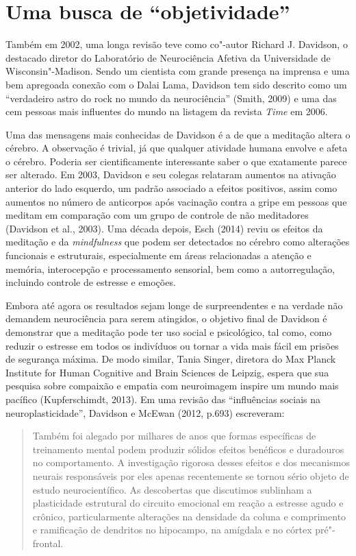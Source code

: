 \chapter{Uma busca de ``objetividade''}

Também em 2002, uma longa revisão teve como co"-autor Richard J.
Davidson, o destacado diretor do Laboratório de Neurociência Afetiva da
Universidade de Wisconsin"-Madison. Sendo um cientista com grande
presença na imprensa e uma bem apregoada conexão com o Dalai Lama,
Davidson tem sido descrito como um ``verdadeiro astro do rock no mundo
da neurociência'' (Smith, 2009) e uma das cem pessoas mais influentes do
mundo na listagem da revista \emph{Time} em 2006.

Uma das mensagens mais conhecidas de Davidson é a de que a meditação
altera o cérebro. A observação é trivial, já que qualquer atividade
humana envolve e afeta o cérebro. Poderia ser cientificamente
interessante saber o que exatamente parece ser alterado. Em 2003,
Davidson e seu colegas relataram aumentos na ativação anterior do lado
esquerdo, um padrão associado a efeitos positivos, assim como aumentos
no número de anticorpos após vacinação contra a gripe em pessoas que
meditam em comparação com um grupo de controle de não meditadores
(Davidson et al., 2003). Uma década depois, Esch (2014) reviu os efeitos
da meditação e da \emph{mindfulness} que podem ser detectados no cérebro
como alterações funcionais e estruturais, especialmente em áreas
relacionadas a atenção e memória, interocepção e processamento
sensorial, bem como a autorregulação, incluindo controle de estresse e
emoções.

Embora até agora os resultados sejam longe de surpreendentes e na
verdade não demandem neurociência para serem atingidos, o objetivo final
de Davidson é demonstrar que a meditação pode ter uso social e
psicológico, tal como, como reduzir o estresse em todos os indivíduos ou
tornar a vida mais fácil em prisões de segurança máxima. De modo
similar, Tania Singer, diretora do Max Planck Institute for Human
Cognitive and Brain Sciences de Leipzig, espera que sua pesquisa sobre
compaixão e empatia com neuroimagem inspire um mundo mais pacífico
(Kupferschimdt, 2013). Em uma revisão das ``influências sociais na
neuroplasticidade'', Davidson e McEwan (2012, p.693) escreveram:

\begin{quote}
Também foi alegado por milhares de anos que formas específicas de
treinamento mental podem produzir sólidos efeitos benéficos e duradouros
no comportamento. A investigação rigorosa desses efeitos e dos
mecanismos neurais responsáveis por eles apenas recentemente se tornou
sério objeto de estudo neurocientífico. As descobertas que discutimos
sublinham a plasticidade estrutural do circuito emocional em reação a
estresse agudo e crônico, particularmente alterações na densidade da
coluna e comprimento e ramificação de dendritos no hipocampo, na
amígdala e no córtex pré"-frontal.
\end{quote}


